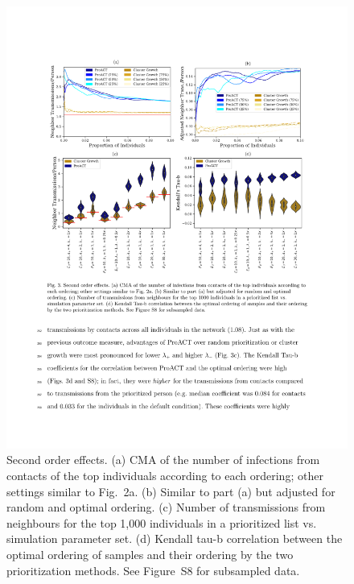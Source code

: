 \documentclass[a4paper,11pt]{article}
\newcommand{\PLWH}{sample\xspace}
\begin{document}
\begin{figure}[!tp]
\centering
\includegraphics[width=\textwidth]{figs/Fig3.pdf}
\caption{Second order effects. 
(a) CMA of the number of infections from contacts of the top individuals according to each ordering; other settings similar to Fig.~2a. (b)
Similar to  part (a) but adjusted for random and optimal ordering.
(c)
Number of transmissions from neighbours for the top 1,000 individuals  in a prioritized list vs. simulation parameter set.
 (d) 
 Kendall tau-b correlation between the optimal ordering of \PLWH{s}  and their ordering by the two prioritization methods.
 See Figure~S8 for subsampled data. 
 }
\label{fig:efficacy-neighbors}
\end{figure}
\end{document}
